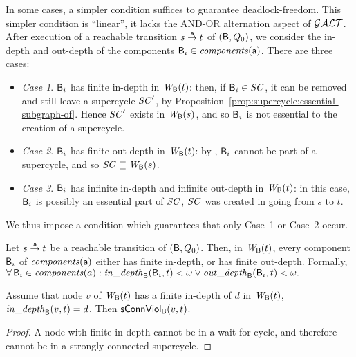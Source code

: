 In some cases, a simpler condition suffices to guarantee deadlock-freedom. This simpler condition is ``linear'', \ie it lacks the AND-OR alternation
aspect of $\GAO$. After execution of a reachable transition $s \la{\act} t$ of $(\B, Q_0)$, 
we consider the in-depth and out-depth of the components $\B_i \in \cmps{\act}$. There are three cases:
%
\begin{itemize}

\item \emph{Case 1}. \label{case:finite-in} $\B_i$ has finite in-depth in $\wfg{\B}{t}$: then, if $\B_i \in \SC$, it can be removed and still leave a
  supercycle $\SC'$, by Proposition~\ref{prop:supercycle:essential-subgraph-of}. Hence $\SC'$ exists in $\wfg{\B}{s}$, and so $\B_i$ is not essential
  to the creation of a supercycle.

\item \emph{Case 2}. \label{case:finite-out} $\B_i$ has finite out-depth in $\wfg{\B}{t}$: by , $\B_i$ cannot be
  part of a supercycle, and so $\SC \subg \wfg{\B}{s}$.

\item \emph{Case 3}. \label{case:infinite-both} $\B_i$ has infinite in-depth and infinite out-depth in $\wfg{\B}{t}$: in this case, $\B_i$ is possibly
  an essential part of $\SC$, \ie $\SC$ was created in going from $s$ to $t$.

\end{itemize}
We thus impose a condition which guarantees that only 
Case~1 %
or Case~2 %
occur. 



\begin{definition} \label{def:global:dfc}
Let $s \goesto[\act] t$ be a reachable transition of $(\B, Q_0)$.
Then, in $\wfg{\B}{t}$,  every component $\B_i$ of $\cmps{\act}$ either has finite in-depth, or has finite out-depth.
Formally, \\
\ind  $\fa \B_i \in \cmps{a}: \widepth{\B}{\B_i}{t} < \omega \lor \wodepth{\B}{\B_i}{t} < \omega.$
\end{definition}



\begin{proposition} \label{prop:indepth-finite-implies-scViol}
Assume that node $v$ of $\wfg{\B}{t}$ has a finite in-depth of $d$ in $\wfg{\B}{t}$, \ie 
$\widepth{\B}{v}{t} = d$. Then $\connViol{v}{t}$.
\end{proposition}
%
\begin{proof}
A node with finite in-depth cannot be in a wait-for-cycle, and
therefore cannot be in a strongly connected supercycle.
\end{proof}


